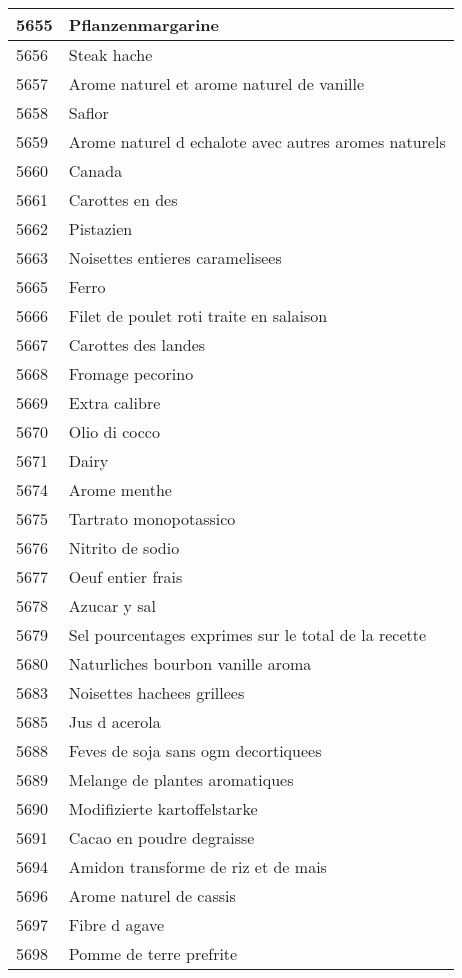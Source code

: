 \begin{longtable}{|l|l|}
5655 & Pflanzenmargarine \\ \hline 
5656 & Steak hache \\ \hline 
5657 & Arome naturel et arome naturel de vanille \\ \hline 
5658 & Saflor \\ \hline 
5659 & Arome naturel d echalote avec autres aromes naturels \\ \hline 
5660 & Canada \\ \hline 
5661 & Carottes en des \\ \hline 
5662 & Pistazien \\ \hline 
5663 & Noisettes entieres caramelisees \\ \hline 
5665 & Ferro \\ \hline 
5666 & Filet de poulet roti traite en salaison \\ \hline 
5667 & Carottes des landes \\ \hline 
5668 & Fromage pecorino \\ \hline 
5669 & Extra calibre \\ \hline 
5670 & Olio di cocco \\ \hline 
5671 & Dairy \\ \hline 
5674 & Arome menthe \\ \hline 
5675 & Tartrato monopotassico \\ \hline 
5676 & Nitrito de sodio \\ \hline 
5677 & Oeuf entier frais \\ \hline 
5678 & Azucar y sal \\ \hline 
5679 & Sel pourcentages exprimes sur le total de la recette \\ \hline 
5680 & Naturliches bourbon vanille aroma \\ \hline 
5683 & Noisettes hachees grillees \\ \hline 
5685 & Jus d acerola \\ \hline 
5688 & Feves de soja sans ogm decortiquees \\ \hline 
5689 & Melange de plantes aromatiques \\ \hline 
5690 & Modifizierte kartoffelstarke \\ \hline 
5691 & Cacao en poudre degraisse \\ \hline 
5694 & Amidon transforme de riz et de mais \\ \hline 
5696 & Arome naturel de cassis \\ \hline 
5697 & Fibre d agave \\ \hline 
5698 & Pomme de terre prefrite \\ \hline 

\end{longtable}
